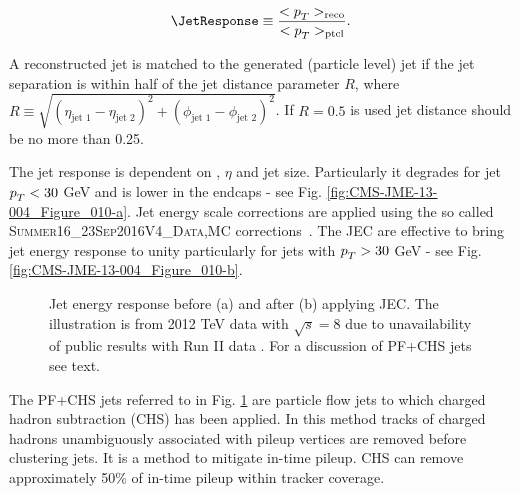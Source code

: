 \begin{description}
\begin{equation}
\JetResponse\equiv\frac{<\pt>_{\text{reco}}}{<\pt>_{\text{ptcl}}}.    
\end{equation}

A reconstructed jet is matched to the generated (particle level) jet if the jet separation is within half of the jet distance parameter $R$, where $R\equiv\sqrt{\left(\eta_{\text{jet\ 1}} - \eta_{\text{jet\ 2}} \right)^{2}+\left(\phi_{\text{jet\ 1}} - \phi_{\text{jet\ 2}}\right)^{2}}$. If $R=0.5$ is used jet distance should be no more than 0.25.

The jet response is dependent on \pt, $\eta$ and jet size. Particularly it degrades for jet $p_{T}^{}<30$ GeV and is lower in the endcaps - see Fig. \ref{fig:CMS-JME-13-004_Figure_010-a}. Jet energy scale corrections are applied using the so called \textsc{Summer16\_23Sep2016V4\_{Data,MC}} corrections~\cite{twiki:JES}. The JEC are effective to bring jet energy response to unity particularly for jets with $p_{T}^{}>30$ GeV - see Fig. \ref{fig:CMS-JME-13-004_Figure_010-b}. 

\begin{figure}[htp]
\centering
  \def\twidth{0.45}
  \centering
  \hfil
\caption{Jet energy response before (a) and after (b) applying JEC. The illustration is from 2012 TeV data with $\sqrt{s}=8$ due to unavailability of public results with Run II data \cite{Khachatryan:2016kdb}. For a discussion of PF+CHS jets see text.}
\label{fig:CMS-JME-13-004_Figure_010}
\end{figure}

The PF+CHS jets referred to in Fig. \ref{fig:CMS-JME-13-004_Figure_010} are particle flow jets to which charged hadron subtraction (CHS) has been applied. In this method tracks of charged hadrons unambiguously associated with pileup vertices are removed before clustering jets. It is a method to mitigate in-time pileup. CHS can remove approximately 50\% of in-time pileup within tracker coverage.


\end{description}
